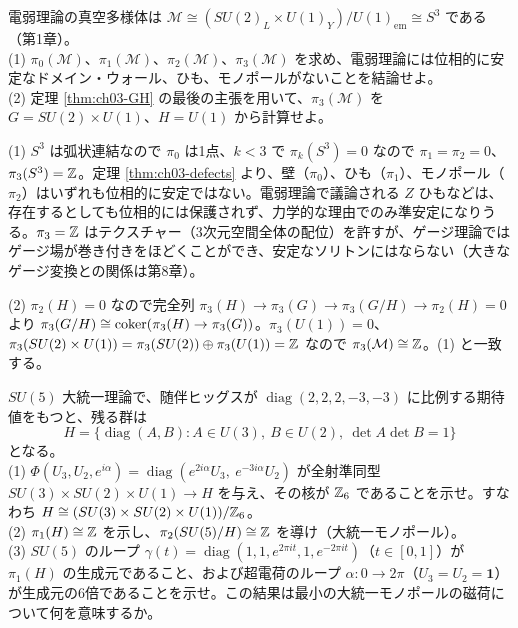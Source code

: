 \begin{problem}[難易度 A]\label{ch03-prob-ew}
電弱理論の真空多様体は $\mathcal M\cong(SU(2)_L\times U(1)_Y)/U(1)_{\mathrm{em}}\cong S^3$ である（第1章）。\\
(1) $\pi_0(\mathcal M)$、$\pi_1(\mathcal M)$、$\pi_2(\mathcal M)$、$\pi_3(\mathcal M)$ を求め、電弱理論には位相的に安定なドメイン・ウォール、ひも、モノポールがないことを結論せよ。\\
(2) 定理 \ref{thm:ch03-GH} の最後の主張を用いて、$\pi_3(\mathcal M)$ を $G=SU(2)\times U(1)$、$H=U(1)$ から計算せよ。
\end{problem}

\begin{solution}
(1) $S^3$ は弧状連結なので $\pi_0$ は1点、$k<3$ で $\pi_k(S^3)=0$ なので $\pi_1=\pi_2=0$、$\pi_3(S^3)=\mathbb{Z}$。定理 \ref{thm:ch03-defects} より、壁（$\pi_0$）、ひも（$\pi_1$）、モノポール（$\pi_2$）はいずれも位相的に安定ではない。電弱理論で議論される $Z$ ひもなどは、存在するとしても位相的には保護されず、力学的な理由でのみ準安定になりうる。$\pi_3=\mathbb{Z}$ はテクスチャー（3次元空間全体の配位）を許すが、ゲージ理論ではゲージ場が巻き付きをほどくことができ、安定なソリトンにはならない（大きなゲージ変換との関係は第8章）。

(2) $\pi_2(H)=0$ なので完全列 $\pi_3(H)\to\pi_3(G)\to\pi_3(G/H)\to\pi_2(H)=0$ より $\pi_3(G/H)\cong\operatorname{coker}(\pi_3(H)\to\pi_3(G))$。$\pi_3(U(1))=0$、$\pi_3(SU(2)\times U(1))=\pi_3(SU(2))\oplus\pi_3(U(1))=\mathbb{Z}$ なので $\pi_3(\mathcal M)\cong\mathbb{Z}$。(1) と一致する。
\end{solution}

\begin{problem}[難易度 C]\label{ch03-prob-gut}
$SU(5)$ 大統一理論で、随伴ヒッグスが $\operatorname{diag}(2,2,2,-3,-3)$ に比例する期待値をもつと、残る群は
\[
H=\{\operatorname{diag}(A,B):A\in U(3),\ B\in U(2),\ \det A\det B=1\}
\]
となる。\\
(1) $\Phi(U_3,U_2,e^{i\alpha})=\operatorname{diag}(e^{2i\alpha}U_3,\ e^{-3i\alpha}U_2)$ が全射準同型 $SU(3)\times SU(2)\times U(1)\to H$ を与え、その核が $\mathbb{Z}_6$ であることを示せ。すなわち $H\cong(SU(3)\times SU(2)\times U(1))/\mathbb{Z}_6$。\\
(2) $\pi_1(H)\cong\mathbb{Z}$ を示し、$\pi_2(SU(5)/H)\cong\mathbb{Z}$ を導け（大統一モノポール）。\\
(3) $SU(5)$ のループ $\gamma(t)=\operatorname{diag}(1,1,e^{2\pi it},1,e^{-2\pi it})$（$t\in[0,1]$）が $\pi_1(H)$ の生成元であること、および超電荷のループ $\alpha\colon0\to2\pi$（$U_3=U_2=\mathbf 1$）が生成元の6倍であることを示せ。この結果は最小の大統一モノポールの磁荷について何を意味するか。
\end{problem}

